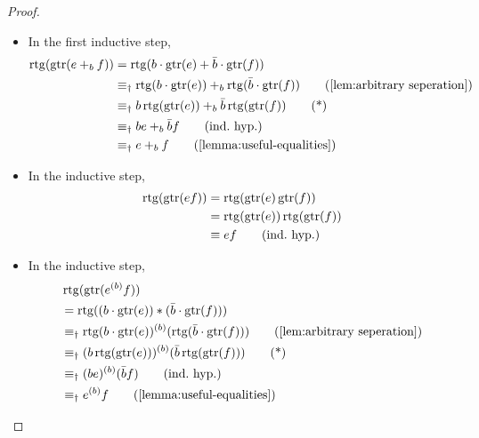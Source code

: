 \documentclass[orivec,envcountsect,envcountsame]{llncs}
\begin{document}
\begin{proof}
\begin{itemize}
\begin{align*}
			&\equiv_\dagger p +_{1} 0 \tag{\textsf{G3}\(\times n\), BA} \\
			&\equiv_\dagger p \tag{G0}
		\end{align*}
		\item
		In the first inductive step,
		\begin{align*}
			\rtg(\gtr(e +_b f))
				&= \rtg(b\cdot \gtr(e) + \bar b\cdot \gtr(f)) \\
				&\equiv_\dagger \rtg(b\cdot \gtr(e)) +_b \rtg(\bar b\cdot \gtr(f)) \tag{\cref{lem:arbitrary seperation}} \\
				&\equiv_\dagger b\rtg(\gtr(e)) +_b \bar b\rtg(\gtr(f)) \tag{*}\\
				&\equiv_\dagger be +_b \bar b f \tag{ind.~hyp.}\\
				&\equiv_\dagger e +_b f \tag{\cref{lemma:useful-equalities}}
		\end{align*}
		\item
		In the inductive step,
		\begin{align*}
			\operatorname{rtg}(\operatorname{gtr}(e f)) &= \operatorname{rtg}(\operatorname{gtr}(e) \operatorname{gtr}(f))\\
						&= \operatorname{rtg}(\operatorname{gtr}(e)) \operatorname{rtg}(\operatorname{gtr}(f))\\
						&\equiv e f \tag{ind.~hyp.}
		\end{align*}
		\item
		In the inductive step,
		\begin{align*}
			&\rtg(\gtr(e^{(b)}f))\\
			&= \rtg((b\cdot \gtr(e))*(\bar b\cdot \gtr(f)))
			\\
			&\equiv_\dagger \rtg(b\cdot \gtr(e))^{(b)}(\rtg(\bar b\cdot \gtr(f))) \tag{\cref{lem:arbitrary seperation}}
			\\
			&\equiv_\dagger (b\rtg(\gtr(e)))^{(b)}(\bar b\rtg(\gtr(f)) ) \tag{*}
			\\
			&\equiv_\dagger (be)^{(b)}(\bar b f) \tag{ind.~hyp.}
			\\
			&\equiv_\dagger e^{(b)}f  \tag{\cref{lemma:useful-equalities}}

\end{align*}
\end{itemize}
\end{proof}
\end{document}
